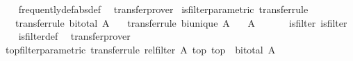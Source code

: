 \begin{isabellebody}
%
\isadelimproof
\ \ %
\endisadelimproof
%
\isatagproof
{}\isamarkupfalse%
\ frequently{\isacharunderscore}{\kern0pt}def{\isacharbrackleft}{\kern0pt}abs{\isacharunderscore}{\kern0pt}def{\isacharbrackright}{\kern0pt}\ \isamarkupfalse%
\ transfer{\isacharunderscore}{\kern0pt}prover%
\endisatagproof
{\isafoldproof}%
%
\isadelimproof
\isanewline
%
\endisadelimproof
\isanewline
{}\isamarkupfalse%
\ is{\isacharunderscore}{\kern0pt}filter{\isacharunderscore}{\kern0pt}parametric\ {\isacharbrackleft}{\kern0pt}transfer{\isacharunderscore}{\kern0pt}rule{\isacharbrackright}{\kern0pt}{\isacharcolon}{\kern0pt}\isanewline
\ \ \ {\isacharbrackleft}{\kern0pt}transfer{\isacharunderscore}{\kern0pt}rule{\isacharbrackright}{\kern0pt}{\isacharcolon}{\kern0pt}\ {\isachardoublequoteopen}bi{\isacharunderscore}{\kern0pt}total\ A{\isachardoublequoteclose}\isanewline
\ \ \ {\isacharbrackleft}{\kern0pt}transfer{\isacharunderscore}{\kern0pt}rule{\isacharbrackright}{\kern0pt}{\isacharcolon}{\kern0pt}\ {\isachardoublequoteopen}bi{\isacharunderscore}{\kern0pt}unique\ A{\isachardoublequoteclose}\isanewline
\ \ \ {\isachardoublequoteopen}{\isacharparenleft}{\kern0pt}{\isacharparenleft}{\kern0pt}{\isacharparenleft}{\kern0pt}A\ {\isacharequal}{\kern0pt}{\isacharequal}{\kern0pt}{\isacharequal}{\kern0pt}{\isachargreater}{\kern0pt}\ {\isacharparenleft}{\kern0pt}{\isacharequal}{\kern0pt}{\isacharparenright}{\kern0pt}{\isacharparenright}{\kern0pt}\ {\isacharequal}{\kern0pt}{\isacharequal}{\kern0pt}{\isacharequal}{\kern0pt}{\isachargreater}{\kern0pt}\ {\isacharparenleft}{\kern0pt}{\isacharequal}{\kern0pt}{\isacharparenright}{\kern0pt}{\isacharparenright}{\kern0pt}\ {\isacharequal}{\kern0pt}{\isacharequal}{\kern0pt}{\isacharequal}{\kern0pt}{\isachargreater}{\kern0pt}\ {\isacharparenleft}{\kern0pt}{\isacharequal}{\kern0pt}{\isacharparenright}{\kern0pt}{\isacharparenright}{\kern0pt}\ is{\isacharunderscore}{\kern0pt}filter\ is{\isacharunderscore}{\kern0pt}filter{\isachardoublequoteclose}\isanewline
%
\isadelimproof
\ \ %
\endisadelimproof
%
\isatagproof
{}\isamarkupfalse%
\ is{\isacharunderscore}{\kern0pt}filter{\isacharunderscore}{\kern0pt}def\ \isamarkupfalse%
\ transfer{\isacharunderscore}{\kern0pt}prover%
\endisatagproof
{\isafoldproof}%
%
\isadelimproof
\isanewline
%
\endisadelimproof
\isanewline
{}\isamarkupfalse%
\ top{\isacharunderscore}{\kern0pt}filter{\isacharunderscore}{\kern0pt}parametric\ {\isacharbrackleft}{\kern0pt}transfer{\isacharunderscore}{\kern0pt}rule{\isacharbrackright}{\kern0pt}{\isacharcolon}{\kern0pt}\ {\isachardoublequoteopen}rel{\isacharunderscore}{\kern0pt}filter\ A\ top\ top{\isachardoublequoteclose}\ \ {\isachardoublequoteopen}bi{\isacharunderscore}{\kern0pt}total\ A{\isachardoublequoteclose}\isanewline

\end{isabellebody}
